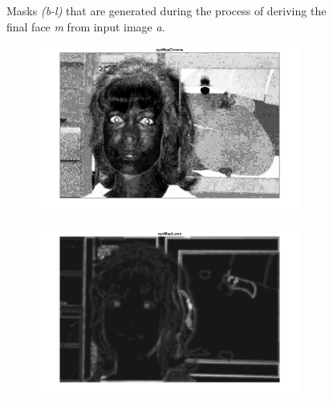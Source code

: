 \begin{figure}[H]
\begin{subfigure}{.24\textwidth}
  \caption{}
\end{subfigure}

\caption{Masks \textit{(b-l)} that are generated during the process of deriving the final face \textit{m} from input image \textit{a}.}
\label{fig:faceMasks}
\end{figure}



\begin{figure}[H]
\centering

\begin{subfigure}{.33\textwidth}
  \centering
  \includegraphics[width=0.95\textwidth]{img/fd2/EyeMapChroma.png}
  \caption{}
\end{subfigure}%
\begin{subfigure}{.33\textwidth}
  \centering
  \includegraphics[width=0.95\textwidth]{img/fd2/EyeMapLuma.png}
  \caption{}
\end{subfigure}%
\begin{subfigure}{.33\textwidth}

\end{subfigure}
\end{figure}
